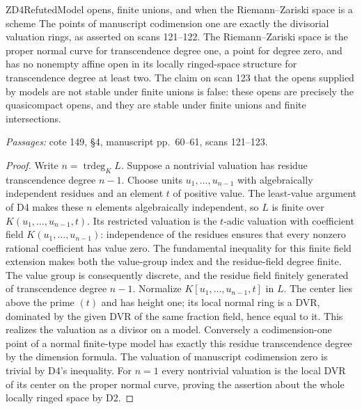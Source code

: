 \begin{result}{ZD4}{Refuted}{Model opens, finite unions, and when the Riemann--Zariski space is a scheme}
The points of manuscript codimension one are exactly the divisorial valuation rings, as asserted on scans 121--122. The Riemann--Zariski space is the proper normal curve for transcendence degree one, a point for degree zero, and has no nonempty affine open in its locally ringed-space structure for transcendence degree at least two. The claim on scan 123 that the opens supplied by models are not stable under finite unions is false: these opens are precisely the quasicompact opens, and they are stable under finite unions and finite intersections.
\par\emph{Passages:} cote 149, \S4, manuscript pp.~60--61, scans 121--123.
\end{result}
\begin{proof}
Write $n=\operatorname{trdeg}_K L$. Suppose a nontrivial valuation has residue transcendence degree $n-1$. Choose units $u_1,\ldots,u_{n-1}$ with algebraically independent residues and an element $t$ of positive value. The least-value argument of D4 makes these $n$ elements algebraically independent, so $L$ is finite over $K(u_1,\ldots,u_{n-1},t)$. Its restricted valuation is the $t$-adic valuation with coefficient field $K(u_1,\ldots,u_{n-1})$: independence of the residues ensures that every nonzero rational coefficient has value zero. The fundamental inequality for this finite field extension makes both the value-group index and the residue-field degree finite. The value group is consequently discrete, and the residue field finitely generated of transcendence degree $n-1$. Normalize $K[u_1,\ldots,u_{n-1},t]$ in $L$. The center lies above the prime $(t)$ and has height one; its local normal ring is a DVR, dominated by the given DVR of the same fraction field, hence equal to it. This realizes the valuation as a divisor on a model. Conversely a codimension-one point of a normal finite-type model has exactly this residue transcendence degree by the dimension formula. The valuation of manuscript codimension zero is trivial by D4's inequality. For $n=1$ every nontrivial valuation is the local DVR of its center on the proper normal curve, proving the assertion about the whole locally ringed space by D2.

\end{proof}
